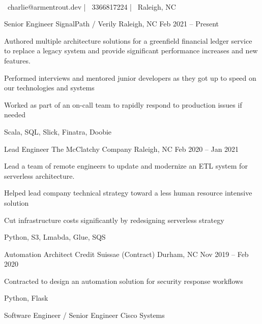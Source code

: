 \documentclass[]{awesome-cv}
\begin{document}
    
\begin{center}
	 \\
	\vspace{2mm}
	{\faEnvelope\ charlie@armentrout.dev} | {\faMobile\ 3366817224} | {\faMapMarker\ Raleigh, NC}
\end{center}
\begin{cventries}
	\cventry
	{Senior Engineer}
	{SignalPath / Verily}
	{Raleigh, NC}
	{Feb 2021 – Present}
	{\begin{cvitems}
		\item {Authored multiple architecture solutions for a greenfield financial ledger service to replace a legacy system and provide significant performance increases and new features.}
		\item {Performed interviews and mentored junior developers as they got up to speed on our technologies and systems}
		\item {Worked as part of an on-call team to rapidly respond to production issues if needed}
		\item {Scala, SQL, Slick, Finatra, Doobie}
		\end{cvitems}}
	\cventry
	{Lead Engineer}
	{The McClatchy Company}
	{Raleigh, NC}
	{Feb 2020 – Jan 2021}
	{\begin{cvitems}
		\item {Lead a team of remote engineers to update and modernize an ETL system for serverless architecture.}
		\item {Helped lead company technical strategy toward a less human resource intensive solution}
		\item {Cut infrastructure costs significantly by redesigning serverless strategy}
		\item {Python, S3, Lmabda, Glue, SQS}
		\end{cvitems}}
	\cventry
	{Automation Architect}
	{Credit Suissae (Contract)}
	{Durham, NC}
	{Nov 2019 – Feb 2020}
	{\begin{cvitems}
		\item {Contracted to design an automation solution for security response workflows}
		\item {Python, Flask}
		\end{cvitems}}
	\cventry
	{Software Engineer / Senior Engineer}
	{Cisco Systems}

\end{cventries}
\end{document}
